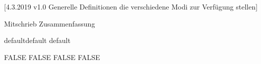 [4.3.2019 v1.0 Generelle Definitionen die verschiedene Modi zur Verfügung stellen]



\providecommand{\LILLYxMODE}{default}
\providecommand\LILLYxMODExDEFAULT{default}
\providecommand\LILLYxMODExDUMMY{dummy}

\providecommand{\LILLYxBOXxMODE}{DEFAULT}
\providecommand{\LILLYxFOOTERxBUTTONS}{TRUE}

\def\LILLY@Typ@Mitschrieb{Mitschrieb}
\def\LILLY@Typ@Uebungsblatt{Uebungsblatt}
\def\LILLY@Typ@Dokumentation{Dokumentation}
\def\LILLY@Typ@Zusammenfassung{Zusammenfassung}

\ifx\LILLY@Typ\LILLY@Typ@Mitschrieb
    \providecommand{\LILLYxBOXxAufgabexBox}{FALSE}
\fi
\ifx\LILLY@Typ\LILLY@Typ@Zusammenfassung
\RequirePackage{imakeidx} %
\fi


\ifx\LILLYxMODE\LILLYxMODExDEFAULT
    \providecommand\LILLYxBOXxBeispielxBox{FALSE}
\else\ifx\LILLYxMODE\LILLXxMODExPRINT
    
    \renewcommand{\LILLYxFOOTERxBUTTONS}{FALSE}
    \providecommand{\LILLYxHYPERLINK}{FALSE}
    \providecommand\LILLYxBOXxBemerkungxBox{FALSE}
    \providecommand\LILLYxBOXxBeweisxBox{FALSE}
    \providecommand\LILLYxBOXxBeispielxBox{FALSE}
    \providecommand\LILLYxBOXxLemmaxBox{FALSE}
    \raggedbottom  %
\fi\fi 


\ifx\LILLYxMODExEXTRA\true %
\else
\fi


\ifx\LILLYxBOXxBeispielxBox\true\else\renewcommand{\LILLYxColorxBeispiel}{Charcoal}\fi
\ifx\LILLYxBOXxBeweisxBox\true\else\renewcommand{\LILLYxColorxBeweis}{Charcoal}\fi
\ifx\LILLYxBOXxBemerkungxBox\true\else\renewcommand{\LILLYxColorxBemerkung}{Charcoal}\fi
\ifx\LILLYxBOXxLemmaxBox\true\else\renewcommand{\LILLYxColorxLemma}{Charcoal}\fi





